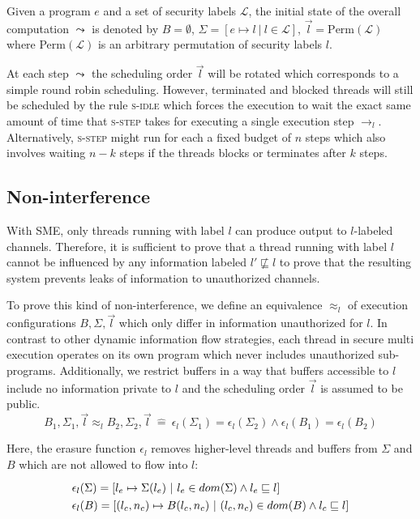 \documentclass[10pt,preprint]{sigplanconf}
\newcommand{\arrayStretch}{1.28}
\begin{document}
Given a program $e$ and a set of security labels $\mathcal{L}$, the initial state of the overall computation $\leadsto$ is denoted by $B = \emptyset$, $\Sigma = [e \mapsto l ~|~ l \in \mathcal{L}]$, $\vec{l} = \text{Perm}(\mathcal{L})$ where Perm$(\mathcal{L})$ is an arbitrary permutation of security labels $l$.

At each step $\leadsto$ the scheduling order $\vec{l}$ will be rotated which corresponds to a simple round robin scheduling.  However, terminated and blocked threads will still be scheduled by the rule \textsc{s-idle} which forces the execution to wait the exact same amount of time that \textsc{s-step} takes for executing a single execution step $\rightarrow_l$.  Alternatively, \textsc{s-step} might run for each a fixed budget of $n$ steps which also involves waiting $n-k$ steps if the threads blocks or terminates after $k$ steps.

\subsection{Non-interference}
\label{s:ni}

With SME, only threads running with label $l$ can produce output to $l$-labeled channels.  Therefore, it is sufficient to prove that a thread running with label $l$ cannot be influenced by any information labeled $l' \not \sqsubseteq l$ to prove that the resulting system prevents leaks of information to unauthorized channels.

To prove this kind of non-interference, we define an equivalence  $\approx_l$ of execution configurations $B,\Sigma,\vec{l}$ which only differ in information unauthorized for $l$.  In contrast to other dynamic information flow strategies, each thread in secure multi execution operates on its own program which never includes unauthorized sub-programs.  Additionally, we restrict buffers in a way that buffers accessible to $l$ include no information private to $l$ and the scheduling order $\vec{l}$ is assumed to be public.
\[ B_1,\Sigma_1, \vec{l} \approx_l B_2,\Sigma_2, \vec{l}~\hat{=}~ \epsilon_l(\Sigma_1) = \epsilon_l(\Sigma_2) \wedge \epsilon_l(B_1) = \epsilon_l(B_2) \]

Here, the erasure function $\epsilon_{l}$ removes higher-level threads and buffers from $\Sigma$ and $B$ which are not allowed to flow into $l$:
\[\arraycolsep=1.6pt\def\arraystretch{\arrayStretch}
\begin{array}{lr}
  \epsilon_{l}(\Sigma) = [ l_e \mapsto \Sigma(l_e) ~|~ l_e \in dom(\Sigma) \wedge l_e \sqsubseteq l ] \\
  \epsilon_{l}(B) = [ (l_c, n_c) \mapsto B(l_c, n_c) ~|~ (l_c, n_c) \in dom(B) \wedge l_c \sqsubseteq l ]
\end{array} \]
\end{document}

